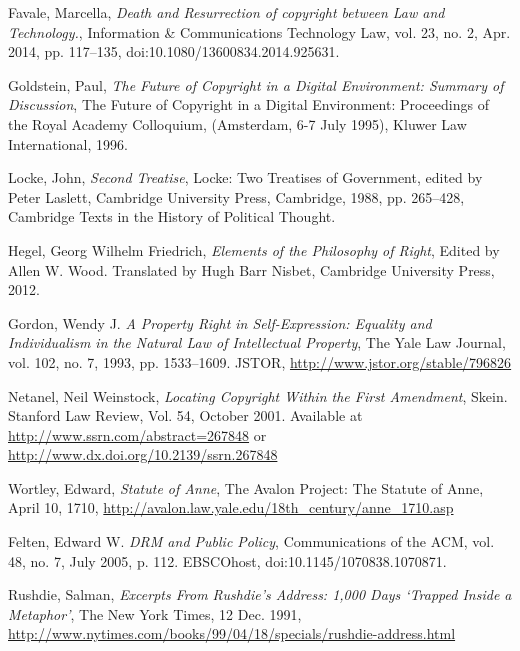 \documentclass[12pt]{article}
\begin{document}
\begin{thebibliography}{9}
    Favale, Marcella,
    \textit{Death and Resurrection of copyright between Law and Technology.},
    Information \& Communications Technology Law,
    vol. 23, no. 2, Apr. 2014, pp. 117–135,
    doi:10.1080/13600834.2014.925631.

    Goldstein, Paul,
    \textit{The Future of Copyright in a Digital Environment: Summary of Discussion},
    The Future of Copyright in a Digital Environment: Proceedings of the Royal Academy Colloquium,
    (Amsterdam, 6-7 July 1995), Kluwer Law International, 1996.

    Locke, John,
    \textit{Second Treatise},
    Locke: Two Treatises of Government,
    edited by Peter Laslett, Cambridge University Press, Cambridge, 1988,
    pp. 265–428,
    Cambridge Texts in the History of Political Thought.

    Hegel, Georg Wilhelm Friedrich,
    \textit{Elements of the Philosophy of Right},
    Edited by Allen W. Wood. Translated by Hugh Barr Nisbet, Cambridge University Press, 2012.

    Gordon, Wendy J.
    \textit{A Property Right in Self-Expression: Equality and Individualism in the Natural Law of Intellectual Property},
    The Yale Law Journal, vol. 102, no. 7, 1993, pp. 1533–1609. JSTOR, \url{http://www.jstor.org/stable/796826}

    Netanel, Neil Weinstock,
    \textit{Locating Copyright Within the First Amendment},
    Skein. Stanford Law Review, Vol. 54, October 2001.
    Available at \url{http://www.ssrn.com/abstract=267848} or \url{http://www.dx.doi.org/10.2139/ssrn.267848}

    Wortley, Edward,
    \textit{Statute of Anne},
    The Avalon Project: The Statute of Anne, April 10, 1710,
    \url{http://avalon.law.yale.edu/18th_century/anne_1710.asp}

    Felten, Edward W.
    \textit{DRM and Public Policy},
    Communications of the ACM, vol. 48, no. 7, July 2005, p. 112.
    EBSCOhost, doi:10.1145/1070838.1070871.

    Rushdie, Salman,
    \textit{Excerpts From Rushdie's Address: 1,000 Days `Trapped Inside a Metaphor'},
    The New York Times, 12 Dec. 1991, \url{http://www.nytimes.com/books/99/04/18/specials/rushdie-address.html}
\end{thebibliography}
\end{document}
